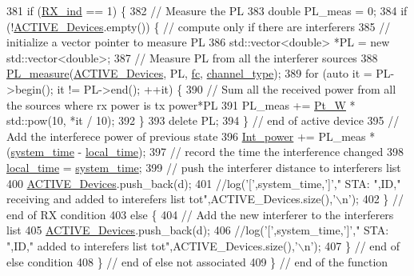\begin{DoxyCode}
381         \textcolor{keywordflow}{if} (\hyperlink{classSTA_aace6d664e5ecf495177277ef030141c6}{RX\_ind} == 1) \{
382             \textcolor{comment}{// Measure the PL}
383             \textcolor{keywordtype}{double} PL\_meas = 0;
384             \textcolor{keywordflow}{if} (!\hyperlink{classSTA_a536179d10f961ae6f7330b980a13668e}{ACTIVE\_Devices}.empty()) \{ \textcolor{comment}{// compute only if there are interferers}
385                 \textcolor{comment}{// initialize a vector pointer to measure PL}
386                 std::vector<double> *PL = \textcolor{keyword}{new} std::vector<double>;
387                 \textcolor{comment}{// Measure PL from all the interferer sources}
388                 \hyperlink{PL__measure_8cpp_afb433c5f099becf495d3c9d29ffc707d}{PL\_measure}(\hyperlink{classSTA_a536179d10f961ae6f7330b980a13668e}{ACTIVE\_Devices}, PL, \hyperlink{classSTA_a07c54eac4b0f34790e0a2e4dcbe720ac}{fc}, 
      \hyperlink{classSTA_a5d1a873bdd6733103441abadf4db1475}{channel\_type});
389                 \textcolor{keywordflow}{for} (\textcolor{keyword}{auto} it = PL->begin(); it != PL->end(); ++it) \{
390                     \textcolor{comment}{// Sum all the received power from all the sources where rx power is tx power*PL}
391                     PL\_meas += \hyperlink{classSTA_a8ec6260021c741ccc08a6ec25793c1f3}{Pt\_W} * std::pow(10, *it / 10);
392                 \}
393                 \textcolor{keyword}{delete} PL;
394             \} \textcolor{comment}{// end of active device}
395               \textcolor{comment}{// Add the interferece power of previous state}
396             \hyperlink{classSTA_aa1e60f7391861b468314437fbad67280}{Int\_power} += PL\_meas * (\hyperlink{STA_8cpp_aaa03a568dc1d9d3391286ea24b9cfb63}{system\_time} - \hyperlink{classSTA_ad4800b03ee83fe283cc33089eb438359}{local\_time});
397             \textcolor{comment}{// record the time the interference changed}
398             \hyperlink{classSTA_ad4800b03ee83fe283cc33089eb438359}{local\_time} = \hyperlink{STA_8cpp_aaa03a568dc1d9d3391286ea24b9cfb63}{system\_time};
399             \textcolor{comment}{// push the interferer distance to interferers list}
400             \hyperlink{classSTA_a536179d10f961ae6f7330b980a13668e}{ACTIVE\_Devices}.push\_back(d);
401             \textcolor{comment}{//log('[',system\_time,']'," STA: ",ID," receiving and added to interefers list
       tot",ACTIVE\_Devices.size(),'\(\backslash\)n');}
402         \} \textcolor{comment}{// end of RX condition}
403         \textcolor{keywordflow}{else} \{
404             \textcolor{comment}{// Add the new interferer to the interferers list}
405             \hyperlink{classSTA_a536179d10f961ae6f7330b980a13668e}{ACTIVE\_Devices}.push\_back(d);
406             \textcolor{comment}{//log('[',system\_time,']'," STA: ",ID," added to interefers list
       tot",ACTIVE\_Devices.size(),'\(\backslash\)n');}
407         \} \textcolor{comment}{// end of else condition}
408     \} \textcolor{comment}{// end of else not associated}
409 \} \textcolor{comment}{// end of the function}
\end{DoxyCode}
